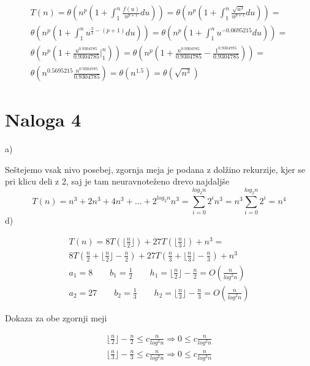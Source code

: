 \documentclass[12pt]{article}
\begin{document}
  \begin{equation}
    \begin{aligned}
      T(n) = \theta(n^p(1 + \int_{1}^{n}{\frac{f(u)}{u^{p+1}}du})) = \theta(n^{p}(1 + \int_{1}^{n}{\frac{\sqrt{u^3}}{u^{p+1}}du})) =\\
      \theta(n^{p}(1 + \int_{1}^{n}{u^{\frac{3}{2}-(p+1)}du})) = \theta(n^{p}(1 + \int_{1}^{n}{u^{-0.0695215}du})) =\\
      \theta(n^{p}(1 + \frac{u^{0.9304785}}{0.9304785}\rvert_{1}^{n})) = \theta(n^{p}(1 + \frac{n^{0.9304785}}{0.9304785} - \frac{1^{0.9304785}}{0.9304785})) =\\
      \theta(n^{0.5695215}\frac{n^{0.9304785}}{0.9304785}) = \theta(n^{1.5}) = \theta(\sqrt{n^3})
    \end{aligned}
  \end{equation}

  \section*{Naloga 4}
  a)

  Seštejemo vsak nivo posebej, zgornja meja je podana z dolžino rekurzije, kjer se pri klicu deli z 2, saj je tam neuravnoteženo drevo najdaljše
  \begin{equation}
    T(n) = n^3 + 2n^3 + 4n^3 + ... + 2^{log_2n}n^3 = \sum_{i=0}^{log_2n}{2^in^3}=n^3\sum_{i=0}^{log_2n}{2^i}=n^4
  \end{equation}
  d)

  \begin{equation}
    \begin{aligned}
      T(n) = 8T(\lfloor{\frac{n}{2}}\rfloor) + 27T(\lfloor{\frac{n}{3}}\rfloor) + n^3 = \\8T(\frac{n}{2} + \lfloor{\frac{n}{2}}\rfloor - \frac{n}{2}) + 27T(\frac{n}{3} + \lfloor{\frac{n}{3}}\rfloor - \frac{n}{3}) + n^3\\
      a_1 = 8\qquad b_1 = \frac{1}{2}\qquad h_1=\lfloor{\frac{n}{2}}\rfloor - \frac{n}{2} = O(\frac{n}{log^2n})\\
      a_2 = 27\qquad b_2 = \frac{1}{3}\qquad h_2=\lfloor{\frac{n}{3}}\rfloor - \frac{n}{3} = O(\frac{n}{log^2n})
    \end{aligned}
  \end{equation}

  Dokaza za obe zgornji meji

  \begin{equation}
    \begin{aligned}
      \lfloor{\frac{n}{2}}\rfloor - \frac{n}{2} \leq c\frac{n}{log^2n} \Rightarrow 0 \leq c\frac{n}{log^2n}\\
      \lfloor{\frac{n}{3}}\rfloor - \frac{n}{3} \leq c\frac{n}{log^2n} \Rightarrow 0 \leq c\frac{n}{log^2n}
    \end{aligned}
  \end{equation}
\end{document}
